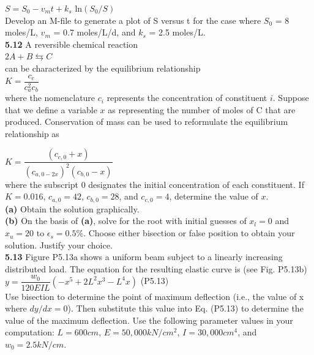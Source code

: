 \documentclass[../main.tex]{subfiles}
\begin{document}
\begin{multicols}{2}
    $S = S_0 - v_mt+k_s$ ln$(S_0/S)$\\

    \noindent Develop an M-file to generate a plot of S versus t for the
    case where $S_0$ = 8 moles/L, $v_m$ = 0.7 moles/L/d, and
    $k_s$ = 2.5 moles/L.\\

    \noindent\textbf{5.12} A reversible chemical reaction\\

    $2A + B \leftrightarrows C$\\

    \noindent can be characterized by the equilibrium relationship\\

    $K = \dfrac{c_c}{c^2_ac_b}$\\

    \noindent where the nomenclature $c_i$ represents the concentration of constituent
    $i$. Suppose that we define a variable $x$ as representing
    the number of moles of C that are produced. Conservation of
    mass can be used to reformulate the equilibrium relationship as

    $K = \dfrac{(c_{c,0}+x)}{(c_{a,0-2x})^2(c_{b,0}-x)}$\\

    \noindent where the subscript 0 designates the initial concentration
    of each constituent. If $K = 0.016$, $c_{a,0}= 42$, $c_{b,0} = 28$, and
    $c_{c,0}= 4$, determine the value of $x$.\\
    \textbf{(a)} Obtain the solution graphically.\\
    \textbf{(b)} On the basis of \textbf{(a)}, solve for the root with initial guesses of
    $x_l=0$ and $x_u=20$ to $\epsilon_s=0.5\%$. Choose either bisection or
    false position to obtain your solution. Justify your choice.\\

    \noindent\textbf{5.13} Figure P5.13a shows a uniform beam subject to a linearly
    increasing distributed load. The equation for the resulting
    elastic curve is (see Fig. P5.13b)\\

    $y = \dfrac{w_0}{120EIL}(-x^5+2L^2x^3-L^4x)$
    \hfill (P5.13)\\

    \noindent Use bisection to determine the point of maximum deflection
    (i.e., the value of x where $dy/dx = 0$). Then substitute this
    value into Eq. (P5.13) to determine the value of the maximum
    deflection. Use the following parameter values in your
    computation: $L = 600 cm$, $E = 50,000 kN/cm^2$, $I =
    30,000 cm^4$, and $w_0 = 2.5 kN/cm$.\\


\end{multicols}
\end{document}
